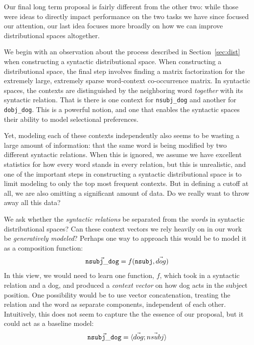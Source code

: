 \documentclass[12pt]{article}
\begin{document}
Our final long term proposal is fairly different from the other two: while
those were ideas to directly impact performance on the two tasks we have
since focused our attention, our last idea focuses more broadly on how
we can improve distributional spaces altogether.

We begin with an observation about the process described in
Section~\ref{sec:dist} when constructing a syntactic distributional space.
When constructing a distributional space, the final step involves finding a
matrix factorization for the extremely large, extremely sparse word-context
co-occurrence matrix. In syntactic spaces, the contexts are distinguished by
the neighboring word {\em together} with its syntactic relation. That is there
is one context for {\tt nsubj\_dog} and another for {\tt dobj\_dog}. This is a
powerful notion, and one that enables the syntactic spaces their ability
to model selectional preferences.

Yet, modeling each of these contexts independently also seems to be wasting
a large amount of information: that the same word is being modified
by two different syntactic relations. When this is ignored,
we assume we have excellent statistics for how every word stands
in every relation, but this is unrealistic, and one of the important
steps in constructing a syntactic distributional space is to limit modeling
to only the top most frequent contexts. But in defining a cutoff at all, we
are also omitting a significant amount of data.
Do we really want to throw away all this data?

We ask whether the {\em syntactic relations} be separated
from the {\em words} in syntactic distributional spaces? 
Can these context vectors we rely heavily on in our work be {\em generatively
modeled}? Perhaps one way to approach this would be to model it as a
composition function:
\begin{equation*}
  \vec{ {\tt nsubj\_dog} } = f({\tt nsubj}, \vec{dog})
\end{equation*}
In this view, we would need to learn one function, $f$, which took in a syntactic
relation and a dog, and produced a {\em context vector} on how dog acts in the
subject position. One possibility would be to use vector concatenation,
treating the relation and the word as separate components, independent of each
other. Intuitively, this does not seem to capture the the essence of our
proposal, but it could act as a baseline model:
\begin{equation*}
  \vec{ {\tt nsubj\_dog} } = \langle \vec{dog} ; \vec{nsubj} \rangle
\end{equation*}
\end{document}
